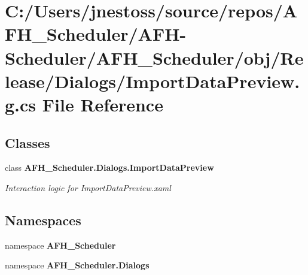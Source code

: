 \section{C\+:/\+Users/jnestoss/source/repos/\+A\+F\+H\+\_\+\+Scheduler/\+A\+F\+H-\/\+Scheduler/\+A\+F\+H\+\_\+\+Scheduler/obj/\+Release/\+Dialogs/\+Import\+Data\+Preview.g.\+cs File Reference}
\label{_release_2_dialogs_2_import_data_preview_8g_8cs}
\subsection*{Classes}
\begin{DoxyCompactItemize}
\item 
class \textbf{ A\+F\+H\+\_\+\+Scheduler.\+Dialogs.\+Import\+Data\+Preview}
\begin{DoxyCompactList}\small\item\em Interaction logic for Import\+Data\+Preview.\+xaml \end{DoxyCompactList}\end{DoxyCompactItemize}
\subsection*{Namespaces}
\begin{DoxyCompactItemize}
\item 
namespace \textbf{ A\+F\+H\+\_\+\+Scheduler}
\item 
namespace \textbf{ A\+F\+H\+\_\+\+Scheduler.\+Dialogs}
\end{DoxyCompactItemize}
